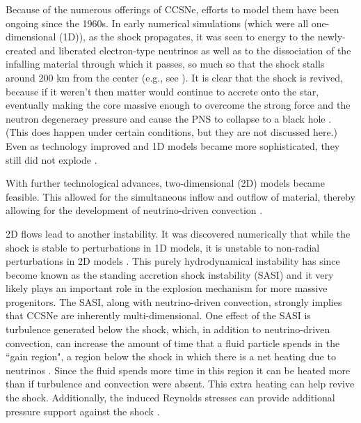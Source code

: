 Because of the numerous offerings of CCSNe, efforts to model them have been
ongoing since the 1960s.
In early numerical simulations (which were all one-dimensional (1D)),
as the shock propagates,
it was seen to energy to the newly-created and liberated
electron-type neutrinos as well as to the dissociation of the
infalling material through which it passes,
so much so that the shock stalls around 200 km from the center
(e.g., see \citet{hm1981}).
It is clear that the shock is revived, because if it weren't then matter
would continue to accrete onto the star, eventually making the core massive
enough to overcome the strong force and the neutron degeneracy pressure
and cause the PNS to collapse
to a black hole \citep{bw1985}.
(This does happen under certain conditions, but they are not discussed here.)
Even as technology improved and 1D
models became more sophisticated, they still did not explode
\citep[e.g., see][]{%
cj1960,
mw1966,
cw1966,
r1979,
hm1981,
bw1985,
mim1991,
mb1993,
mb1993a,
mb1993b,
rj2000,
mlm2001,
rj2002,
twi2003,
tbp2003,
lmm2004,
kjh2006,
sys2007,
zwh2008,
hmj2010,
thr2017,
sro2019,
bmo2021,
gmm2023%
}.

With further technological advances, two-dimensional (2D) models
became feasible.
This allowed for the simultaneous inflow and outflow of material,
thereby allowing for the development of neutrino-driven convection
\citep[e.g., see][]{%
hbc1992,
sys1993,
jm1995,
jm1995a,
mcb1998,
kpj2003,
kjh2006,
sjf2008,
fkh2011,
mm2011,
mjw2012,
tks2012,
mdb2013,
roa2016,
gmm2023%
}.

2D flows lead to another instability.
It was discovered numerically that while the shock is stable to
perturbations in 1D models, it is unstable to non-radial perturbations
in 2D models \citep{bmd2003}.
This purely hydrodynamical instability has since become known as the
standing accretion shock instability (SASI) and it very likely plays an
important role in the explosion mechanism for more massive progenitors.
The SASI, along with neutrino-driven convection, strongly implies that
CCSNe are inherently multi-dimensional.
One effect of the SASI is turbulence generated below the shock,
which, in addition to neutrino-driven convection,
can increase the amount of time that a fluid particle spends
in the ``gain region", a region below the shock in which there is a
net heating due to neutrinos \citep{co2015}.
Since the fluid spends more time in this region it can be heated more than if
turbulence and convection were absent.
This extra heating can help revive the shock.
Additionally, the induced Reynolds stresses can provide additional
pressure support against the shock \citep[e.g., see][]{mm2018}.

